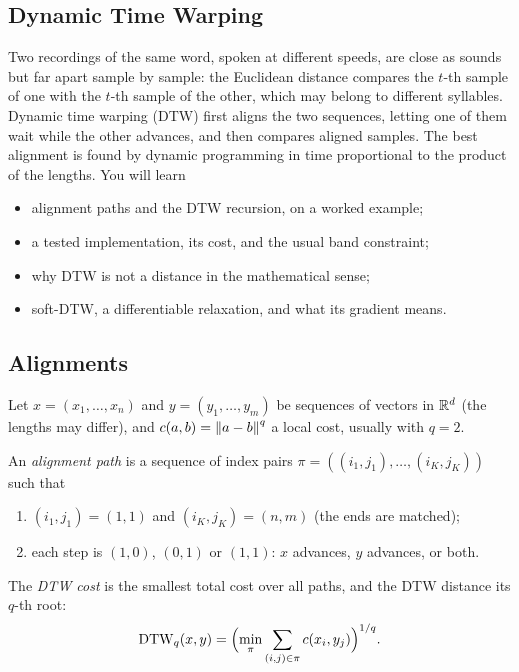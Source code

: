 \begin{notechapter}
\chapter{Dynamic Time Warping}\label{ch:dtw}

\begin{chapterintro}
Two recordings of the same word, spoken at different speeds, are close as sounds but
far apart sample by sample: the Euclidean distance compares the $t$-th sample of one with
the $t$-th sample of the other, which may belong to different syllables. Dynamic time
warping (DTW) first aligns the two sequences, letting one of them wait while the other
advances, and then compares aligned samples. The best alignment is found by dynamic
programming in time proportional to the product of the lengths. You will learn
\begin{itemize}[nosep]
  \item alignment paths and the DTW recursion, on a worked example;
  \item a tested implementation, its cost, and the usual band constraint;
  \item why DTW is not a distance in the mathematical sense;
  \item soft-DTW, a differentiable relaxation, and what its gradient means.
\end{itemize}
\end{chapterintro}

\section{Alignments}\label{dtw:sec:alignment}

Let $x = (x_1,\dots,x_n)$ and $y = (y_1,\dots,y_m)$ be sequences of vectors in $\mathbb{R}^d$ (the lengths may differ),
and $c(a, b) = \left\|a - b\right\|^q$ a local cost, usually with $q = 2$.

\begin{definition}
An \emph{alignment path} is a sequence of index pairs $\pi = ((i_1, j_1),\dots,(i_K, j_K))$ such that
\begin{enumerate}[nosep]
  \item $(i_1, j_1) = (1, 1)$ and $(i_K, j_K) = (n, m)$ (the ends are matched);
  \item each step is $(1, 0)$, $(0, 1)$ or $(1, 1)$: $x$ advances, $y$ advances, or both.
\end{enumerate}
The \emph{DTW cost} is the smallest total cost over all paths, and the DTW distance its $q$-th root:
\[
  \mathrm{DTW}_q(x, y) = \Bigl(\min_\pi\sum_{(i,j)\in\pi}c(x_i, y_j)\Bigr)^{1/q} .
\]
\end{definition}


\end{notechapter}
